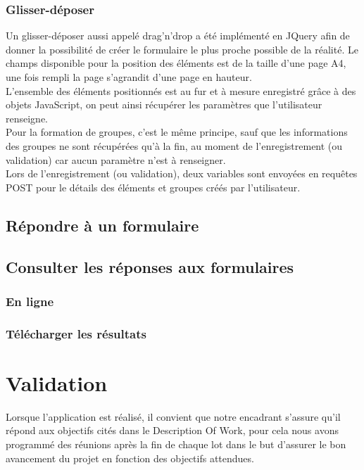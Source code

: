 \documentclass{sigplanconf}
\begin{document}
\subsubsection{Glisser-déposer}
Un glisser-déposer aussi appelé drag'n'drop a été implémenté en JQuery afin de donner la possibilité de créer le formulaire le plus proche possible de la réalité. Le champs disponible pour la position des éléments est de la taille d’une page A4, une fois rempli la page s’agrandit d’une page en hauteur.\\
L'ensemble des éléments positionnés est au fur et à mesure enregistré grâce à des objets JavaScript, on peut ainsi récupérer les paramètres que l'utilisateur renseigne.\\
Pour la formation de groupes, c’est le même principe, sauf que les informations des groupes ne sont récupérées qu’à la fin, au moment de l’enregistrement (ou validation) car aucun paramètre n’est à renseigner.\\
Lors de l’enregistrement (ou validation), deux variables sont envoyées en requêtes POST pour le détails des éléments et groupes créés par l’utilisateur.

\subsection{Répondre à un formulaire}

\subsection{Consulter les réponses aux formulaires}
\subsubsection{En ligne}
\subsubsection{Télécharger les résultats}

\section{Validation}
Lorsque l'application est réalisé, il convient que notre encadrant s'assure qu'il répond aux objectifs cités dans le Description Of Work, pour cela nous avons programmé des réunions après la fin de chaque lot dans le but d’assurer le bon avancement du projet en fonction des objectifs attendues.
\end{document}

